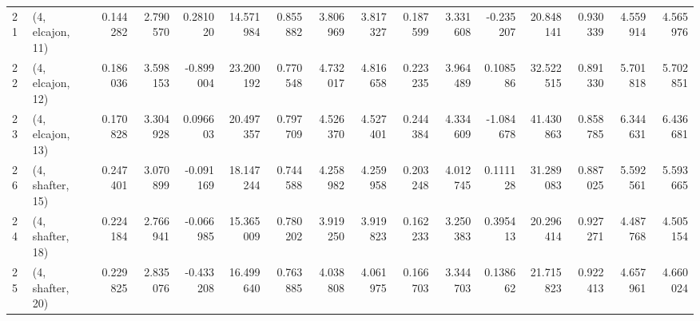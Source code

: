 \begin{tabular}{llrrrrrrrrrrrrrr}
21 &  (4, elcajon, 11) &   0.144282 &  2.790570 &  0.281020 &   14.571984 &  0.855882 &   3.806969 &   3.817327 &  0.187599 &   3.331608 & -0.235207 &   20.848141 &  0.930339 &   4.559914 &   4.565976 \\
22 &  (4, elcajon, 12) &   0.186036 &  3.598153 & -0.899004 &   23.200192 &  0.770548 &   4.732017 &   4.816658 &  0.223235 &   3.964489 &  0.108586 &   32.522515 &  0.891330 &   5.701818 &   5.702851 \\
23 &  (4, elcajon, 13) &   0.170828 &  3.304928 &  0.096603 &   20.497357 &  0.797709 &   4.526370 &   4.527401 &  0.244384 &   4.334609 & -1.084678 &   41.430863 &  0.858785 &   6.344631 &   6.436681 \\
26 &  (4, shafter, 15) &   0.247401 &  3.070899 & -0.091169 &   18.147244 &  0.744588 &   4.258982 &   4.259958 &  0.203248 &   4.012745 &  0.111128 &   31.289083 &  0.887025 &   5.592561 &   5.593665 \\
24 &  (4, shafter, 18) &   0.224184 &  2.766941 & -0.066985 &   15.365009 &  0.780202 &   3.919250 &   3.919823 &  0.162233 &   3.250383 &  0.395413 &   20.296414 &  0.927271 &   4.487768 &   4.505154 \\
25 &  (4, shafter, 20) &   0.229825 &  2.835076 & -0.433208 &   16.499640 &  0.763885 &   4.038808 &   4.061975 &  0.166703 &   3.344703 &  0.138662 &   21.715823 &  0.922413 &   4.657961 &   4.660024 \\
\bottomrule
\end{tabular}
